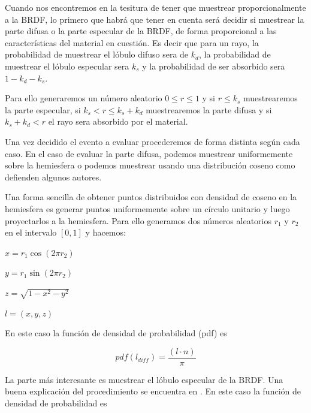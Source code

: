 \medskip
Cuando nos encontremos en la tesitura de tener que muestrear proporcionalmente a la BRDF, lo primero que habrá que tener en cuenta será decidir si muestrear la parte difusa o la parte especular de la BRDF, de forma proporcional a las características del material en cuestión. Es decir que para un rayo, la probabilidad de muestrear el lóbulo difuso sera de $k_d$, la probabilidad de muestrear el lóbulo especular sera $k_s$ y la probabilidad de ser absorbido sera $1 - k_d - k_s$.

\medskip

Para ello generaremos un número aleatorio $0 \leq r \leq 1$ y si
$r \leq k_s$ muestrearemos la parte especular,
si $k_s < r \leq k_s + k_d$ muestrearemos la parte difusa
y si $k_s + k_d < r$ el rayo sera absorbido por el material.

\medskip

Una vez decidido el evento a evaluar procederemos de forma distinta según cada caso. En el caso de evaluar la parte difusa, podemos muestrear uniformemente sobre la hemiesfera o podemos muestrear usando una distribución coseno como defienden algunos autores.

\clearpage

Una forma sencilla de obtener puntos distribuidos con densidad de coseno en la hemiesfera es generar puntos uniformemente sobre un círculo unitario y luego proyectarlos a la hemiesfera.
Para ello generamos dos números aleatorios $r_1$ y $r_2$ en el intervalo $[0, 1]$ y hacemos:

\smallskip

$x = r_1 \cos (2\pi r_2)$

\smallskip

$y = r_1 \sin (2\pi r_2)$

\smallskip

$z = \sqrt{1 - x^2 - y^2}$

\smallskip

$l = (x, y, z)$

\medskip

En este caso la función de densidad de probabilidad (pdf) es

\smallskip

\begin{equation}
pdf(l_{diff}) = \frac{(l \cdot n)}{\pi}
\end{equation}

La parte más interesante es muestrear el lóbulo especular de la BRDF. Una buena explicación del procedimiento se encuentra en \cite{Lafortune1994}. En este caso la función de densidad de probabilidad es


